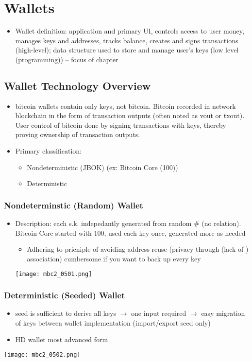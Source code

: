 \documentclass[english, 11pt]{article}
\begin{document}
\section{Wallets}
\begin{itemize}
    \item Wallet definition: application and primary UI, controls access to user money, manages keys and addresses, tracks balance, creates and signs transactions (high-level); data structure used to store and manage user's keys (low level (programming)) -- focus of chapter
\end{itemize}
\subsection{Wallet Technology Overview}
\begin{itemize}
    \item bitcoin wallets contain only keys, not bitcoin. Bitcoin recorded in network blockchain in the form of transaction outputs (often noted as vout or txout). User control of bitcoin done by signing transactions with keys, thereby proving ownership of transaction outputs.
    \item Primary classification:
    \begin{itemize}
        \item Nondeterministic (JBOK) (ex: Bitcoin Core (100))
        \item Deterministic
    \end{itemize}
\end{itemize}
\subsubsection{Nondeterminstic (Random) Wallet}
\begin{itemize}
    \item Description: each s.k. indepedantly generated from random # (no relation). Bitcoin Core started with 100, used each key once, generated more as needed
    \begin{itemize}
        \item Adhering to pricniple of avoiding address reuse (privacy through (lack of ) association) cumbersome if you want to back up every key
    \end{itemize}
    \texttt{[image: mbc2\_0501.png]}
\end{itemize}
\subsubsection{Deterministic (Seeded) Wallet}
\begin{itemize}
    \item seed is sufficient to derive all keys $\rightarrow$ one input required $\rightarrow$ easy migration of keys between wallet implementation (import/export seed only)
    \item HD wallet most advanced form
\end{itemize}
\texttt{[image: mbc2\_0502.png]}
\end{document}

